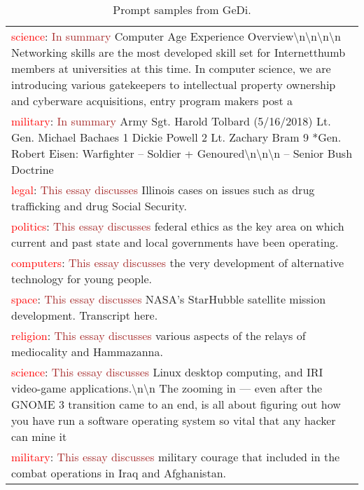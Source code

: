 \begin{table*}
\begin{tabular}{p{}}
\textcolor{red}{science}: \textcolor{brown}{In summary} Computer Age Experience Overview\textbackslash n\textbackslash n\textbackslash n\textbackslash n Networking skills are the most developed skill set for Internetthumb members at universities at this time. In computer science, we are introducing various gatekeepers to intellectual property ownership and cyberware acquisitions, entry program makers post a \\
\textcolor{red}{military}: \textcolor{brown}{In summary} Army Sgt. Harold Tolbard (5/16/2018) Lt. Gen. Michael Bachaes 1 Dickie Powell 2 Lt. Zachary Bram 9 *Gen. Robert Eisen: Warfighter – Soldier + Genoured\textbackslash n\textbackslash n\textbackslash n – Senior Bush Doctrine \\
\textcolor{red}{legal}: \textcolor{brown}{This essay discusses} Illinois cases on issues such as drug trafficking and drug Social Security. \\
\textcolor{red}{politics}: \textcolor{brown}{This essay discusses} federal ethics as the key area on which current and past state and local governments have been operating. \\
\textcolor{red}{computers}: \textcolor{brown}{This essay discusses} the very development of alternative technology for young people. \\
\textcolor{red}{space}: \textcolor{brown}{This essay discusses} NASA's StarHubble satellite mission development. Transcript here. \\
\textcolor{red}{religion}: \textcolor{brown}{This essay discusses} various aspects of the relays of mediocality and Hammazanna. \\
\textcolor{red}{science}: \textcolor{brown}{This essay discusses} Linux desktop computing, and IRI video-game applications.\textbackslash n\textbackslash n The zooming in — even after the GNOME 3 transition came to an end, is all about figuring out how you have run a software operating system so vital that any hacker can mine it \\
\textcolor{red}{military}: \textcolor{brown}{This essay discusses} military courage that included in the combat operations in Iraq and Afghanistan. \\
\bottomrule
\end{tabular}
\caption{Prompt samples from GeDi.}
\label{table:prompt-examples-gedi}
\end{table*}






